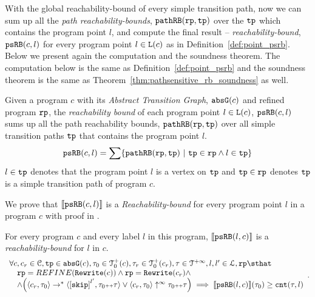 With the global reachability-bound of every simple transition path, now we can sum up all the \emph{path reachability-bounds}, $\mathtt{pathRB}(\mathtt{rp}, \mathtt{tp})$ over the $\mathtt{tp}$ which contains the program point $l$, and compute the final result -- \emph{reachability-bound}, $\mathtt{psRB}(c, l)$ for every program point $l \in \mathtt{L}(c)$ as in Definition~\ref{def:point_psrb}.
Below we present again the computation and the soundness theorem.
The computation below is the same as Definition~\ref{def:point_psrb}
and the soundness theorem is the same as Theorem~\ref{thm:pathsensitive_rb_soundness} as well.
 \begin{definition}
  Given a program $c$ with its \emph{Abstract Transition Graph}, $\mathtt{abs}{\mathtt{G}}(c)$ and refined program $\mathtt{rp}$,
  the \emph{reachability bound} of each program point $l \in \mathtt{L}(c)$, $\mathtt{psRB}(c, l)$ 
  sums up all the path reachability bounds, $\mathtt{pathRB}(\mathtt{rp}, \mathtt{tp})$ over all simple transition paths $\mathtt{tp}$ that contains the program point $l$.
  \[ 
    \psRB(c, l) = 
    \sum
    \left\{ \inoutB(\rprog, \tpath) ~\vert~ \tpath \in \rprog \land 
    l \in \tpath \right\}
  \]
  $l \in \mathtt{tp}$ denotes that the program point $l$ is a vertex on $\mathtt{tp}$ 
  and $\mathtt{tp} \in \mathtt{rp}$ denotes $\mathtt{tp}$ is a simple transition path of program $c$.
 \end{definition}
We prove that $\llbracket \mathtt{psRB}(c, l) \rrbracket$ is a \emph{Reachability-bound} for every program point $l$ in a program $c$ with proof in .
\begin{theorem}
  For every program ${c}$ and every label $l$ in this program,
  $\llbracket \mathtt{psRB}(l, c) \rrbracket$ is a \emph{reachability-bound} for $l$ in $c$.
  \[
   \begin{array}{l}
   \forall c, c_r \in \cdom, \tpath \in \absG(c), \trace_0 \in \ftdom_0(c), \trace_r \in \ftdom_0(c_r), \trace \in \tdom, l, l' \in \ldom, \rprog \sthat 
   \\ \quad
   \rprog = REFINE(\algrewrite(c))
   \land 
   \rprog = \algrewrite(c_r)
   \land
   \\ \quad
   \land
   \Big(
   \config{c_r, \trace_0} \rightarrow^* \config{\clabel{\eskip}^{l'}, \trace_0 \tracecat \trace}
   \lor \config{c_r, \trace_0} \uparrow^{\infty} \trace_0 \tracecat \trace 
   \Big)
   \implies \econfig{\psRB(l, c)}(\trace_0) \geq \counter(\trace, l)
   \end{array}.
  \]
\end{theorem}
